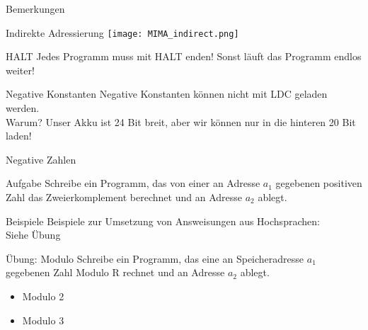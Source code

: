 \begin{frame}{Bemerkungen}
	\begin{block}{Indirekte Adressierung}
		\centering
		\texttt{[image: MIMA\_indirect.png]}
	\end{block}
	
	\pause
	\begin{block}{HALT}
		Jedes Programm muss mit HALT enden! Sonst läuft das Programm endlos weiter!
	\end{block}

	\pause
	\begin{block}{Negative Konstanten}
		Negative Konstanten können nicht mit LDC geladen werden.\\
		Warum? \pause Unser Akku ist 24 Bit breit, aber wir können nur in die hinteren 20 Bit laden!
	\end{block}
\end{frame}

\begin{frame}{Negative Zahlen}
	\begin{block}{Aufgabe}
		Schreibe ein Programm, das von einer an Adresse $a_1$ gegebenen positiven Zahl das Zweierkomplement berechnet und an Adresse $a_2$ ablegt.
	\end{block}

\end{frame}

\begin{frame}{Beispiele}
	Beispiele zur Umsetzung von Answeisungen aus Hochsprachen:\\
	Siehe Übung
\end{frame}

\begin{frame}{Übung: Modulo}
	Schreibe ein Programm, das eine an Speicheradresse $a_1$ gegebenen Zahl Modulo R rechnet und an Adresse $a_2$ ablegt.
	\begin{itemize}
		\item Modulo 2
		\item Modulo 3
	\end{itemize}
\end{frame}


